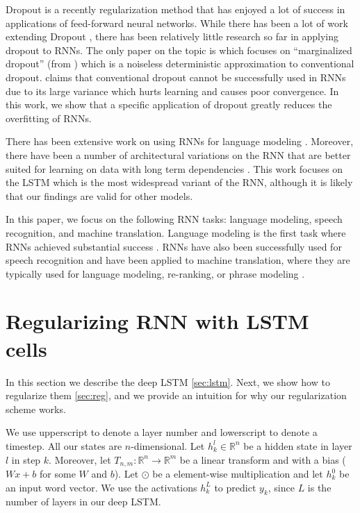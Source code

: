 \documentclass{article}
\begin{document}
Dropout \cite{srivastava2013improving} is a recently regularization
method that has enjoyed a lot of success in applications of
feed-forward neural networks.  While there has been a lot of work
extending Dropout \cite{wang2013fast, wan2013regularization}, there
has been relatively little research so far in applying dropout to
RNNs. The only paper on the topic is \cite{bayer2013fast} which
focuses on ``marginalized dropout'' (from \cite{wang2013fast}) which
is a noiseless deterministic approximation to conventional dropout.
\cite{bayer2013fast} claims that conventional dropout cannot be
successfully used in RNNs due to its large variance which hurts
learning and causes poor convergence. In this work, we show that a
specific application of dropout greatly reduces the overfitting of RNNs.

There has been extensive work on using RNNs for language modeling
\cite{mikolov2012statistical, sutskever2013training}. Moreover, there
have been a number of architectural variations on the RNN that are
better suited for learning on data with long term dependencies
\cite{hochreiter1997long, graves2009novel, cho2014learning,
  jaeger2007optimization, koutnik2014clockwork}.  This work focuses on the LSTM which
is the most widespread variant of the RNN, although it is likely that 
our findings are valid for other models.

In this paper, we focus on the following RNN tasks: language
modeling, speech recognition, and machine translation.  Language
modeling is the first task where RNNs achieved substantial success
\cite{mikolov2010recurrent, mikolov2011strategies,
  pascanu2013construct}.  RNNs have also been successfully used for
speech recognition \cite{robinson1996use, graves2013speech} and have
been applied to machine translation, where they are typically
used for language modeling, re-ranking, or phrase modeling
\cite{SVL2014,cho2014learning,chow1987byblos,mikolov2013exploiting}.

\section{Regularizing RNN with LSTM cells}

In this section we describe the deep LSTM \ref{sec:lstm}. Next, 
we show how to regularize them \ref{sec:reg}, and we provide an intuition
for why our regularization scheme works.

We use upperscript to denote a layer number and lowerscript to denote
a timestep.  All our states are $n$-dimensional.  Let $h^l_k \in
\mathbb{R}^{n}$ be a hidden state in layer $l$ in step $k$. Moreover,
let $T_{n,m}:\mathbb{R}^{n} \rightarrow \mathbb{R}^{m}$ be a linear
transform and with a bias ($Wx + b$ for some $W$ and $b$).  Let
$\odot$ be a element-wise multiplication and let $h^0_k$ be an input
word vector.  We use the activations $h^{L}_k$ to predict $y_k$, since
$L$ is the number of layers in our deep LSTM.
\end{document}
